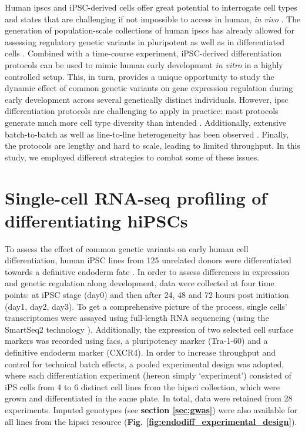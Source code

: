 Human \gls{ipsc}s and iPSC-derived cells offer great potential to interrogate cell types and states that are challenging if not impossible to access in human, \textit{in vivo} \cite{kilpinen2017common}.
The generation of population-scale collections of human \gls{ipsc}s \cite{kilpinen2017common, carcamo2017analysis} has already allowed for assessing regulatory genetic variants in pluripotent \cite{kilpinen2017common, carcamo2017analysis} as well as in differentiated cells \cite{schwartzentruber2018molecular, alasoo2018shared, pashos2017large}.
Combined with a time-course experiment, iPSC-derived differentiation protocols can be used to mimic human early development \textit{in vitro} in a highly controlled setup. This, in turn, provides a unique opportunity to study the dynamic effect of common genetic variants on gene expression regulation during early development across several genetically distinct individuals.
However, \gls{ipsc} differentiation protocols are challenging to apply in practice: most protocols generate much more cell type diversity than intended \cite{bock2011reference}.
Additionally, extensive batch-to-batch as well as line-to-line heterogeneity has been observed \cite{schwartzentruber2018molecular, carcamo2017analysis}. 
Finally, the protocols are lengthy and hard to scale, leading to limited throughput.
In this study, we employed different strategies to combat some of these issues.

\newpage

\section{Single-cell RNA-seq profiling of differentiating hiPSCs}
\label{sec:endodiff_summary}

To assess the effect of common genetic variants on early human cell differentiation, human iPSC lines from 125 unrelated donors were differentiated towards a definitive endoderm fate \cite{hannan2013production}.
In order to assess differences in expression and genetic regulation along development, data were collected at four  time points: at iPSC stage (day0) and then after 24, 48 and 72 hours post initiation (day1, day2, day3).
To get a comprehensive picture of the process, single cells' transcriptomes were assayed using full-length RNA sequencing (using the SmartSeq2 technology \cite{picelli2013smart}).
Additionally, the expression of two selected cell surface markers was recorded using \gls{facs}, a pluripotency marker (Tra-1-60) and a definitive endoderm marker (CXCR4).
In order to increase throughput and control for technical batch effects, a pooled experimental design
was adopted, where each differentiation experiment (hereon simply `experiment') consisted of iPS cells from 4 to 6 distinct cell lines from the \gls{hipsci} collection, which were grown and differentiated in the same plate.
In total, data were retained from 28 experiments.
Imputed genotypes (see \textbf{section \ref{sec:gwas}}) were also available for all lines from the \gls{hipsci} resource (\textbf{Fig. \ref{fig:endodiff_experimental_design}}).

